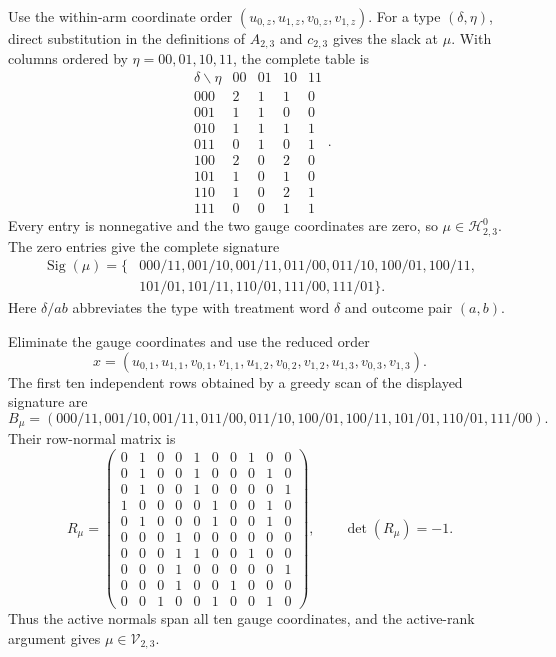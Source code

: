Use the within-arm coordinate order \((u_{0,z},u_{1,z},v_{0,z},v_{1,z})\). For a type \((\delta,\eta)\), direct substitution in the definitions of \(A_{2,3}\) and \(c_{2,3}\) gives the slack at \(\mu\). With columns ordered by \(\eta=00,01,10,11\), the complete table is
\[\begin{array}{c|rrrr}\delta\backslash\eta&00&01&10&11\\ \hline 000&2&1&1&0\\001&1&1&0&0\\010&1&1&1&1\\011&0&1&0&1\\100&2&0&2&0\\101&1&0&1&0\\110&1&0&2&1\\111&0&0&1&1\end{array}.\]
Every entry is nonnegative and the two gauge coordinates are zero, so \(\mu\in\mathcal H^0_{2,3}\). The zero entries give the complete signature
\[\begin{aligned}\operatorname{Sig}(\mu)=\{&000/11,001/10,001/11,011/00,011/10,100/01,100/11,\\&101/01,101/11,110/01,111/00,111/01\}.\end{aligned}\]
Here \(\delta/ab\) abbreviates the type with treatment word \(\delta\) and outcome pair \((a,b)\).

Eliminate the gauge coordinates and use the reduced order
\[x=(u_{0,1},u_{1,1},v_{0,1},v_{1,1},u_{1,2},v_{0,2},v_{1,2},u_{1,3},v_{0,3},v_{1,3}).\]
The first ten independent rows obtained by a greedy scan of the displayed signature are
\[B_\mu=(000/11,001/10,001/11,011/00,011/10,100/01,100/11,101/01,110/01,111/00).\]
Their row-normal matrix is
\[R_\mu=\begin{pmatrix}0&1&0&0&1&0&0&1&0&0\\0&1&0&0&1&0&0&0&1&0\\0&1&0&0&1&0&0&0&0&1\\1&0&0&0&0&1&0&0&1&0\\0&1&0&0&0&1&0&0&1&0\\0&0&0&1&0&0&0&0&0&0\\0&0&0&1&1&0&0&1&0&0\\0&0&0&1&0&0&0&0&0&1\\0&0&0&1&0&0&1&0&0&0\\0&0&1&0&0&1&0&0&1&0\end{pmatrix},\qquad\det(R_\mu)=-1.\]
Thus the active normals span all ten gauge coordinates, and the active-rank argument gives \(\mu\in\mathcal V_{2,3}\).

